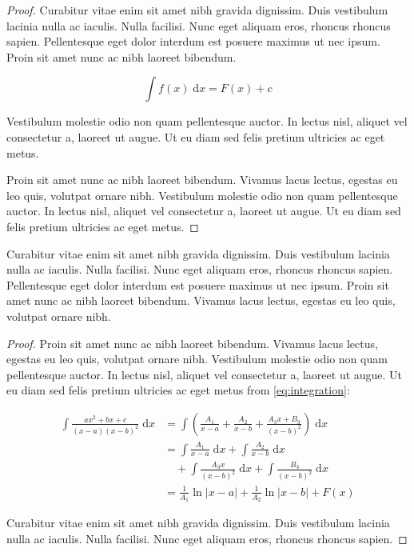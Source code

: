 \begin{proof}
Curabitur vitae enim sit amet nibh gravida dignissim. Duis vestibulum lacinia nulla ac iaculis. Nulla facilisi. Nunc eget aliquam eros, rhoncus rhoncus sapien. Pellentesque eget dolor interdum est posuere maximus ut nec ipsum. Proin sit amet nunc ac nibh laoreet bibendum. 

\[ \int f(x) \;\mathrm{d}x = F(x) + c \]

Vestibulum molestie odio non quam pellentesque auctor. In lectus nisl, aliquet vel consectetur a, laoreet ut augue. Ut eu diam sed felis pretium ultricies ac eget metus.

Proin sit amet nunc ac nibh laoreet bibendum. Vivamus lacus lectus, egestas eu leo quis, volutpat ornare nibh. Vestibulum molestie odio non quam pellentesque auctor. In lectus nisl, aliquet vel consectetur a, laoreet ut augue. Ut eu diam sed felis pretium ultricies ac eget metus.
\end{proof}

\begin{theorem}[Curabitur]
Curabitur vitae enim sit amet nibh gravida dignissim. Duis vestibulum lacinia nulla ac iaculis. Nulla facilisi. Nunc eget aliquam eros, rhoncus rhoncus sapien. Pellentesque eget dolor interdum est posuere maximus ut nec ipsum. Proin sit amet nunc ac nibh laoreet bibendum. Vivamus lacus lectus, egestas eu leo quis, volutpat ornare nibh.
\end{theorem}

\begin{proof}
Proin sit amet nunc ac nibh laoreet bibendum. Vivamus lacus lectus, egestas eu leo quis, volutpat ornare nibh. Vestibulum molestie odio non quam pellentesque auctor. In lectus nisl, aliquet vel consectetur a, laoreet ut augue. Ut eu diam sed felis pretium ultricies ac eget metus from \eqref{eq:integration}:

\begin{align}
\int \frac{ax^2+bx+c}{(x-a)(x-b)^2} \;\mathrm{d}x
& = \int \left( \frac{A_1}{x-a} + \frac{A_2}{x-b} + \frac{A_3x+B_3}{(x-b)^2} \right) \;\mathrm{d}x
\\ \nonumber
& = \int \frac{A_1}{x-a} \;\mathrm{d}x + \int \frac{A_2}{x-b} \;\mathrm{d}x 
\\
& \quad + \int \frac{A_3x}{(x-b)^2} \;\mathrm{d}x + \int \frac{B_3}{(x-b)^2} \;\mathrm{d}x
\\
& = \frac{1}{A_1} \ln \lvert x-a \rvert + \frac{1}{A_2}\ln \lvert x-b \rvert + F(x)
\end{align}

Curabitur vitae enim sit amet nibh gravida dignissim. Duis vestibulum lacinia nulla ac iaculis. Nulla facilisi. Nunc eget aliquam eros, rhoncus rhoncus sapien. 	
\end{proof}

